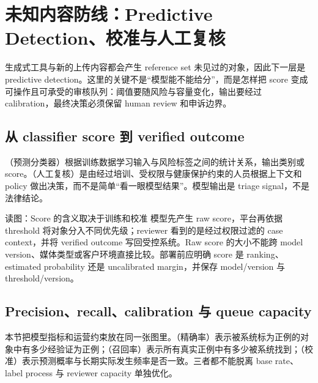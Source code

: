 \section{未知内容防线：Predictive Detection、校准与人工复核}

生成式工具与新的上传内容都会产生 reference set 未见过的对象，因此下一层是 predictive detection。这里的关键不是“模型能不能给分”，而是怎样把 score 变成可操作且可承受的审核队列：阈值要随风险与容量变化，输出要经过 calibration，最终决策必须保留 human review 和申诉边界。

\subsection{从 classifier score 到 verified outcome}

（预测分类器）根据训练数据学习输入与风险标签之间的统计关系，输出类别或 score。（人工复核）是由经过培训、受权限与健康保护约束的人员根据上下文和 policy 做出决策，而不是简单“看一眼模型结果”。模型输出是 triage signal，不是法律结论。


\begin{knowledgebox}{读图：Score 的含义取决于训练和校准}
模型先产生 raw score，平台再依据 threshold 将对象分入不同优先级；reviewer 看到的是经过权限过滤的 case context，并将 verified outcome 写回受控系统。Raw score 的大小不能跨 model version、媒体类型或客户环境直接比较。部署前应明确 score 是 ranking、estimated probability 还是 uncalibrated margin，并保存 model/version 与 threshold/version。
\end{knowledgebox}


\subsection{Precision、recall、calibration 与 queue capacity}

本节把模型指标和运营约束放在同一张图里。（精确率）表示被系统标为正例的对象中有多少经验证为正例；（召回率）表示所有真实正例中有多少被系统找到；（校准）表示预测概率与长期实际发生频率是否一致。三者都不能脱离 base rate、label process 与 reviewer capacity 单独优化。


